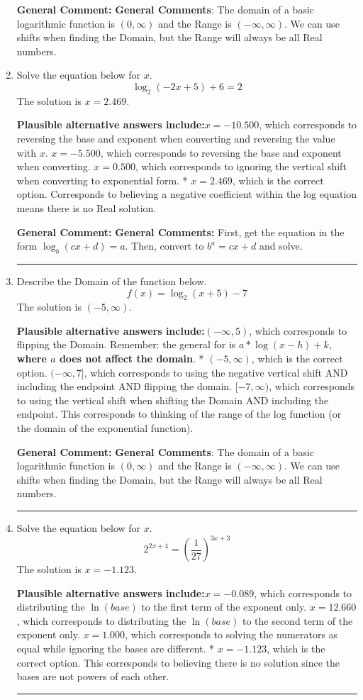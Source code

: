 \documentclass{extbook}[14pt]
\newcommand{\litem}[1]{\item #1

\rule{\textwidth}{0.4pt}}
\begin{document}
\begin{enumerate}
{\textbf{General Comment:} \textbf{General Comments}: The domain of a basic logarithmic function is $(0, \infty)$ and the Range is $(-\infty, \infty)$. We can use shifts when finding the Domain, but the Range will always be all Real numbers.
}
\litem{
Solve the equation below for $x$.
\[ \log_{2}{(-2x+5)}+6 = 2 \]The solution is \( x = 2.469 \).\begin{enumerate}[label=\Alph*.]
\textbf{Plausible alternative answers include:}$x = -10.500$, which corresponds to reversing the base and exponent when converting and reversing the value with $x$.
$x = -5.500$, which corresponds to reversing the base and exponent when converting.
$x = 0.500$, which corresponds to ignoring the vertical shift when converting to exponential form.
* $x = 2.469$, which is the correct option.
Corresponds to believing a negative coefficient within the log equation means there is no Real solution.
\end{enumerate}

\textbf{General Comment:} \textbf{General Comments:} First, get the equation in the form $\log_b{(cx+d)} = a$. Then, convert to $b^a = cx+d$ and solve.
}
\litem{
Describe the Domain of the function below.
\[ f(x) = \log_2{(x+5)}-7 \]The solution is \( (-5, \infty) \).\begin{enumerate}[label=\Alph*.]
\textbf{Plausible alternative answers include:}$(-\infty, 5)$, which corresponds to flipping the Domain. Remember: the general for is $a*\log(x-h)+k$, \textbf{where $a$ does not affect the domain}.
* $(-5, \infty)$, which is the correct option.
$(-\infty, 7]$, which corresponds to using the negative vertical shift AND including the endpoint AND flipping the domain.
$[-7, \infty)$, which corresponds to using the vertical shift when shifting the Domain AND including the endpoint.
This corresponds to thinking of the range of the log function (or the domain of the exponential function).
\end{enumerate}

\textbf{General Comment:} \textbf{General Comments}: The domain of a basic logarithmic function is $(0, \infty)$ and the Range is $(-\infty, \infty)$. We can use shifts when finding the Domain, but the Range will always be all Real numbers.
}
\litem{
Solve the equation below for $x$.
\[ 2^{2x+4} = \left(\frac{1}{27}\right)^{3x+3} \]The solution is \( x = -1.123 \).\begin{enumerate}[label=\Alph*.]
\textbf{Plausible alternative answers include:}$x = -0.089$, which corresponds to distributing the $\ln(base)$ to the first term of the exponent only.
$x = 12.660$, which corresponds to distributing the $\ln(base)$ to the second term of the exponent only.
$x = 1.000$, which corresponds to solving the numerators as equal while ignoring the bases are different.
* $x = -1.123$, which is the correct option.
This corresponds to believing there is no solution since the bases are not powers of each other.
\end{enumerate}

}
\end{enumerate}
\end{document}
